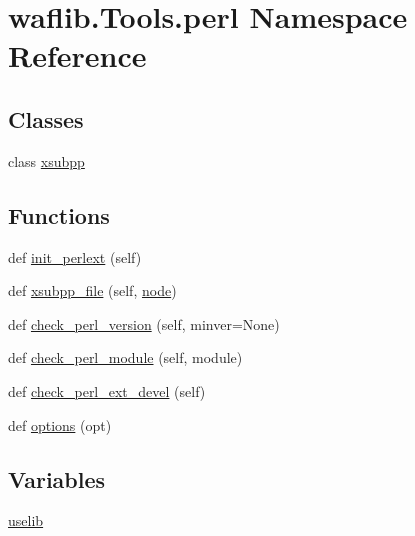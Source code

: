 \hypertarget{namespacewaflib_1_1_tools_1_1perl}{}\section{waflib.\+Tools.\+perl Namespace Reference}
\label{namespacewaflib_1_1_tools_1_1perl}
\subsection*{Classes}
\begin{DoxyCompactItemize}
\item 
class \hyperlink{classwaflib_1_1_tools_1_1perl_1_1xsubpp}{xsubpp}
\end{DoxyCompactItemize}
\subsection*{Functions}
\begin{DoxyCompactItemize}
\item 
def \hyperlink{namespacewaflib_1_1_tools_1_1perl_ad690c9b4e0627683b8d8eb680a42daf8}{init\+\_\+perlext} (self)
\item 
def \hyperlink{namespacewaflib_1_1_tools_1_1perl_ad98847198592a78a56515c15f095334e}{xsubpp\+\_\+file} (self, \hyperlink{structnode}{node})
\item 
def \hyperlink{namespacewaflib_1_1_tools_1_1perl_ac466c27b926b7d70a6643f8d055f62f6}{check\+\_\+perl\+\_\+version} (self, minver=None)
\item 
def \hyperlink{namespacewaflib_1_1_tools_1_1perl_a96349a7aa3669ed96474a23459e98246}{check\+\_\+perl\+\_\+module} (self, module)
\item 
def \hyperlink{namespacewaflib_1_1_tools_1_1perl_ae2effbe87451eba35dd7aa8cfa8d6b1a}{check\+\_\+perl\+\_\+ext\+\_\+devel} (self)
\item 
def \hyperlink{namespacewaflib_1_1_tools_1_1perl_af58a6392e1e27cd335c892a619206093}{options} (opt)
\end{DoxyCompactItemize}
\subsection*{Variables}
\begin{DoxyCompactItemize}
\item 
\hyperlink{namespacewaflib_1_1_tools_1_1perl_a3feee7810adee4c820dbf3dd65544933}{uselib}
\end{DoxyCompactItemize}


